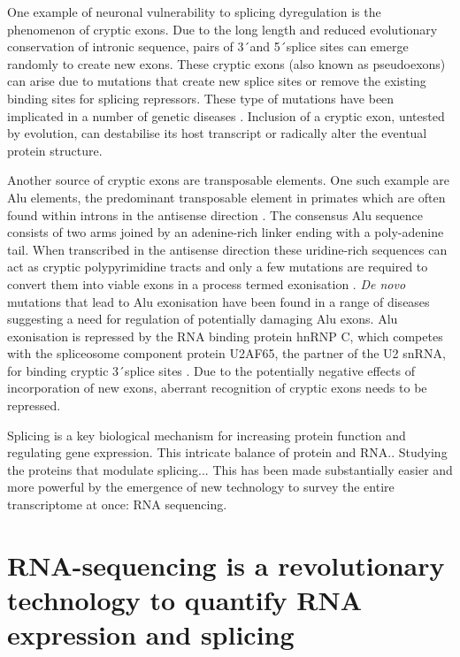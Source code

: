 One example of neuronal vulnerability to splicing dyregulation is the phenomenon of cryptic exons.
Due to the long length and reduced evolutionary conservation of intronic sequence, pairs of 3\'\ and 5\'\ splice sites can emerge randomly to create new exons. These cryptic exons (also known as pseudoexons) can arise due to mutations that create new splice sites or remove the existing binding sites for splicing repressors. These type of mutations have been implicated in a number of genetic diseases \citep{Eng2004-lq, Buratti2007-iz, Vorechovsky2006-wb,Meili2009-hc}. 
Inclusion of a cryptic exon, untested by evolution, can destabilise its host transcript or radically alter the eventual protein structure. 

Another source of cryptic exons are transposable elements. 
One such example are Alu elements, the predominant transposable element in primates which are often found within introns in the antisense direction \citep{Deininger2011-hc}. 
The consensus Alu sequence consists of two arms joined by an adenine-rich linker ending with a poly-adenine tail.  
When transcribed in the antisense direction these uridine-rich sequences can act as cryptic polypyrimidine tracts and only a few mutations are required to convert them into viable exons in a process termed exonisation \citep{Sorek2002-cm}.
\textit{De novo} mutations that lead to Alu exonisation have been found in a range of diseases \citep{Vorechovsky2010-or} suggesting a need for regulation of potentially damaging Alu exons. 
Alu exonisation is repressed by the RNA binding protein hnRNP C, which competes with the spliceosome component protein U2AF65, the partner of the U2 snRNA, for binding cryptic 3\'\ splice sites \citep{Zarnack2013-nv}. 
Due to the potentially negative effects of incorporation of new exons, aberrant recognition of cryptic exons needs to be repressed.

Splicing is a key biological mechanism for increasing protein function and regulating gene expression.
This intricate balance of protein and RNA.. 
Studying the proteins that modulate splicing... 
This has been made substantially easier and more powerful by the emergence of new technology to survey the entire transcriptome at once: RNA sequencing.



\section{RNA-sequencing is a revolutionary technology to quantify RNA expression and splicing} %

